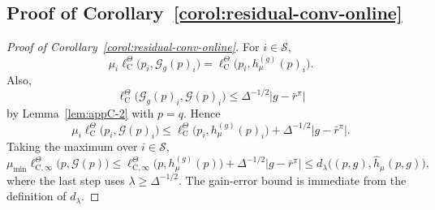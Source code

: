 \documentclass{article}
\newcommand{\X}{\mathcal{S}}
\begin{document}
\subsection{Proof of Corollary~\ref{corol:residual-conv-online}}
\begin{proof}[Proof of Corollary~\ref{corol:residual-conv-online}]
For $i \in \X$,
\begin{equation}
\mu_i \ell^\Theta_{\mathrm C}\bigl(p_i, \mathcal G_g(p)_i\bigr) = \ell^\Theta_{\mathrm C}\bigl(p_i, h^{(g)}_\mu (p)_i\bigr).
\end{equation}
Also,
\begin{equation}
\ell^\Theta_{\mathrm C}\bigl(\mathcal G_g(p)_i, \mathcal G(p)_i\bigr) \le \Delta^{-1/2}\lvert g - \bar r^\pi \rvert
\end{equation}
by Lemma~\ref{lem:appC-2} with $p = q$. Hence
\begin{equation}
\mu_i \ell^\Theta_{\mathrm C}\bigl(p_i, \mathcal G(p)_i\bigr) \le \ell^\Theta_{\mathrm C}\bigl(p_i, h^{(g)}_\mu(p)_i\bigr) + \Delta^{-1/2}\lvert g - \bar r ^\pi\rvert.
\end{equation}
Taking the maximum over $i \in \X$,
\begin{equation}
\mu_{\min}\ell^\Theta_{\mathrm C,\infty}\bigl(p, \mathcal G(p)\bigr) \le \ell^\Theta_{\mathrm C, \infty}\bigl(p, h^{(g)}_\mu(p)\bigr) + \Delta^{-1/2}\lvert g - \bar r^\pi\rvert \le d_\lambda\bigl((p, g), \hat h_\mu(p, g)\bigr),
\end{equation}
where the last step uses $\lambda \ge \Delta^{-1/2}$. The gain-error bound is immediate from the definition of $d_\lambda$.
\end{proof}
\end{document}
